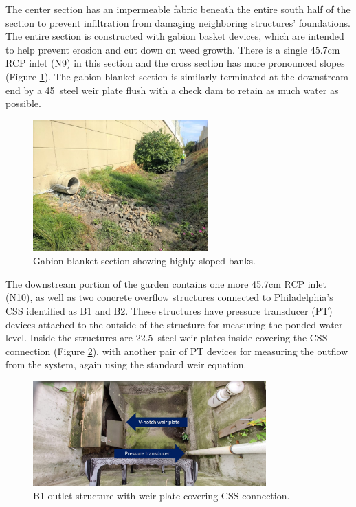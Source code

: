The center section has an impermeable fabric beneath the entire south half of the section to prevent infiltration from damaging neighboring structures' foundations.
The entire section is constructed with gabion basket devices, which are intended to help prevent erosion and cut down on weed growth.
There is a single 45.7cm RCP inlet (N9) in this section and the cross section has more pronounced slopes (Figure \ref{fig:gabion-blanket}).
The gabion blanket section is similarly terminated at the downstream end by a 45\degree\ steel weir plate flush with a check dam to retain as much water as possible.

\begin{figure}[ht!]
	\centering
	\includegraphics[width=0.6\textwidth]{gfx/chapter-instrumentation/gabion-blanket.jpg}
	\caption{Gabion blanket section showing highly sloped banks.}
	\label{fig:gabion-blanket}
\end{figure}

The downstream portion of the garden contains one more 45.7cm RCP inlet (N10), as well as two concrete overflow structures connected to Philadelphia's CSS identified as B1 and B2.
These structures have pressure transducer (PT) devices attached to the outside of the structure for measuring the ponded water level.
Inside the structures are 22.5\degree\ steel weir plates inside covering the CSS connection (Figure \ref{fig:outlet-structure}), with another pair of PT devices for measuring the outflow from the system, again using the standard weir equation.

\begin{figure}[ht!]
	\centering
	\includegraphics[width=0.8\textwidth]{gfx/chapter-instrumentation/b1-outlet-structure.jpg}
	\caption{B1 outlet structure with weir plate covering CSS connection.}
	\label{fig:outlet-structure}
\end{figure}

